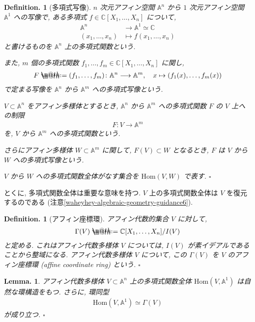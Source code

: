 \documentclass[openany, a4paper, oneside]{jsbook}
\makeatletter
\newcommand*{\defeq}{\mathrel{\rlap{%
\raisebox{0.3ex}{$\m@th\cdot$}}%
\raisebox{-0.3ex}{$\m@th\cdot$}}%
=}
\theoremstyle{break}
\newtheorem{lem}[thm]{Lemma.}
\theoremstyle{breakdefn}
\newtheorem{defn}[thm]{Definition.}
\newcommand{\fin}{\hfill $\square$ \par}
\newcommand{\homo}{\mathrm{Hom}}
\newcommand{\map}{\longrightarrow}
\makeatother
\begin{document}
\begin{defn}[多項式写像]
$n$ 次元アフィン空間 $\mathbb{A}^n$ から $1$ 次元アフィン空間 $\mathbb{A}^1$ への写像で,
ある多項式 $f \in \mathbb{C}[X_1,\dots,X_n]$ について,
\begin{align}
 \mathbb{A}^n
 &\map
 \mathbb{A}^1
 \simeq
 \mathbb{C} \\
 (x_1,\dots,x_n)
 &\longmapsto
 f (x_1,\dots,x_n)
\end{align}
と書けるものを $\mathbb{A}^n$ 上の多項式関数という.

また, $m$ 個の多項式関数 $f_1,\dots,f_m \in \mathbb{C}[X_1,\dots,X_n]$ に関し,
\begin{align}
 F
 \defeq
 (f_1,\dots,f_m) \colon \mathbb{A}^n \map \mathbb{A}^m, \quad x \mapsto (f_1 (x),\dots,f_m (x))
\end{align}
で定まる写像を $\mathbb{A}^n$ から $\mathbb{A}^m$ への多項式写像という.

$V \subset \mathbb{A}^n$ をアフィン多様体とするとき,
$\mathbb{A}^n$ から $\mathbb{A}^m$ への多項式関数 $F$ の $V$ 上への制限
\begin{align}
 F \colon V \map \mathbb{A}^m
\end{align}
を, $V$ から $\mathbb{A}^m$ への多項式関数という.

さらにアフィン多様体 $W \subset \mathbb{A}^m$ に関して, $F (V) \subset W$ となるとき, $F$ は $V$ から $W$ への多項式写像という.

$V$ から $W$ への多項式関数全体がなす集合を $\homo (V,W)$ で表す. \fin
\end{defn}
とくに, 多項式関数全体は重要な意味を持つ.
$V$ 上の多項式関数全体は $V$ を復元するのである (注意\ref{waheyhey-algebraic-geometry-guidance6}).
\begin{defn}[アフィン座標環]
アフィン代数的集合 $V$ に対して,
\begin{align}
 \Gamma ( V )
 \defeq
 \mathbb{C}[X_1, \dots, X_n] /  I ( V )
\end{align}
と定める.
これはアフィン代数多様体 $V$ については, $I (V)$ が素イデアルであることから整域になる.
アフィン代数多様体 $V$ について, この $\Gamma (V)$ を $V$ のアフィン座標環 (affine coordinate ring) という. \fin
\end{defn}
\begin{lem}
アフィン代数多様体 $V \subset \mathbb{A}^n$ 上の多項式関数全体 $\homo (V,\mathbb{A}^1)$ は自然な環構造をもつ.
さらに, 環同型
\begin{align}
 \homo (V, \mathbb{A}^1)
 \simeq
 \Gamma (V)
\end{align}
が成り立つ. \fin
\end{lem}
\end{document}
